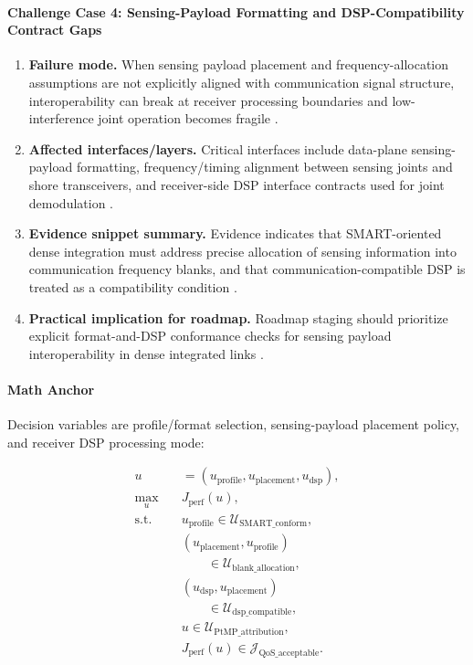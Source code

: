 \documentclass[lettersize,journal]{IEEEtran}
\begin{document}
\paragraph{Challenge Case 4: Sensing-Payload Formatting and DSP-Compatibility Contract Gaps}
\begin{enumerate}
    \item \textbf{Failure mode.} When sensing payload placement and frequency-allocation assumptions are not explicitly aligned with communication signal structure, interoperability can break at receiver processing boundaries and low-interference joint operation becomes fragile \cite{O_ISAC_220}.
    \item \textbf{Affected interfaces/layers.} Critical interfaces include data-plane sensing-payload formatting, frequency/timing alignment between sensing joints and shore transceivers, and receiver-side DSP interface contracts used for joint demodulation \cite{O_ISAC_220}.
    \item \textbf{Evidence snippet summary.} Evidence indicates that SMART-oriented dense integration must address precise allocation of sensing information into communication frequency blanks, and that communication-compatible DSP is treated as a compatibility condition \cite{O_ISAC_220}.
    \item \textbf{Practical implication for roadmap.} Roadmap staging should prioritize explicit format-and-DSP conformance checks for sensing payload interoperability in dense integrated links \cite{O_ISAC_220}.
\end{enumerate}

\paragraph{Math Anchor}
Decision variables are profile/format selection, sensing-payload placement policy, and receiver DSP processing mode:

\begin{equation}
\begin{aligned}
u &= (u_{\mathrm{profile}},u_{\mathrm{placement}},u_{\mathrm{dsp}}),\\
\max_{u}\quad & J_{\mathrm{perf}}(u),\\
\text{s.t.}\quad
& u_{\mathrm{profile}} \in \mathcal{U}_{\mathrm{SMART\_conform}},\\
& (u_{\mathrm{placement}},u_{\mathrm{profile}})\\
&\qquad \in \mathcal{U}_{\mathrm{blank\_allocation}},\\
& (u_{\mathrm{dsp}},u_{\mathrm{placement}})\\
&\qquad \in \mathcal{U}_{\mathrm{dsp\_compatible}},\\
& u \in \mathcal{U}_{\mathrm{PtMP\_attribution}},\\
& J_{\mathrm{perf}}(u) \in \mathcal{J}_{\mathrm{QoS\_acceptable}}.
\end{aligned}
\end{equation}
\end{document}

